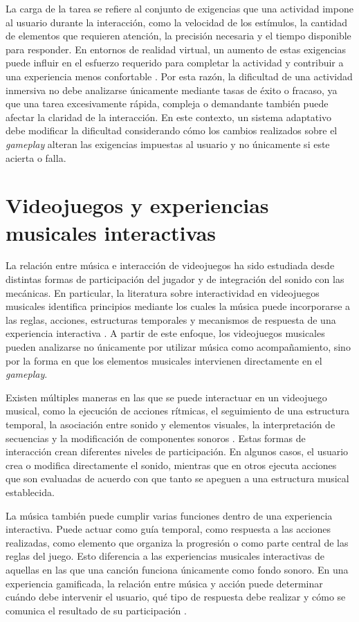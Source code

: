 La carga de la tarea se refiere al conjunto de exigencias que una 
actividad impone al usuario durante la interacción, como la velocidad de 
los estímulos, la cantidad de elementos que requieren atención, la 
precisión necesaria y el tiempo disponible para responder. En entornos 
de realidad virtual, un aumento de estas exigencias puede influir en el 
esfuerzo requerido para completar la actividad y contribuir a una 
experiencia menos confortable \cite{sepich2022workload}. Por esta razón, 
la dificultad de una actividad inmersiva no debe analizarse únicamente 
mediante tasas de éxito o fracaso, ya que una tarea excesivamente rápida, 
compleja o demandante también puede afectar la claridad de la interacción. 
En este contexto, un sistema adaptativo debe modificar la dificultad 
considerando cómo los cambios realizados sobre el \textit{gameplay} 
alteran las exigencias impuestas al usuario y no únicamente si este 
acierta o falla.

\section{Videojuegos y experiencias musicales interactivas}
La relación entre música e interacción de videojuegos ha sido estudiada 
desde distintas formas de participación del jugador y de integración del 
sonido con las mecánicas. En particular, la literatura sobre 
interactividad en videojuegos musicales identifica principios mediante 
los cuales la música puede incorporarse a las reglas, acciones, 
estructuras temporales y mecanismos de respuesta de una experiencia 
interactiva \cite{pichlmair2007sound}. A partir de este enfoque, los 
videojuegos musicales pueden analizarse no únicamente por utilizar 
música como acompañamiento, sino por la forma en que los elementos 
musicales intervienen directamente en el \textit{gameplay}.

Existen múltiples maneras en las que se puede interactuar en un 
videojuego musical, como la ejecución de acciones rítmicas, el 
seguimiento de una estructura temporal, la asociación entre sonido y 
elementos visuales, la interpretación de secuencias y la modificación de 
componentes sonoros \cite{pichlmair2007sound}. Estas formas de interacción crean diferentes niveles 
de participación. En algunos casos, el usuario crea o modifica 
directamente el sonido, mientras que en otros ejecuta acciones que son 
evaluadas de acuerdo con que tanto se apeguen a una estructura musical 
establecida. 

La música también puede cumplir varias funciones dentro de una 
experiencia interactiva. Puede actuar como guía temporal, como 
respuesta a las acciones realizadas, como elemento que organiza la 
progresión o como parte central de las reglas del juego. Esto diferencia 
a las experiencias musicales interactivas de aquellas en las que una 
canción funciona únicamente como fondo sonoro. En una experiencia 
gamificada, la relación entre música y acción puede determinar cuándo 
debe intervenir el usuario, qué tipo de respuesta debe realizar y cómo 
se comunica el resultado de su participación \cite{rashed2025engagement}.

